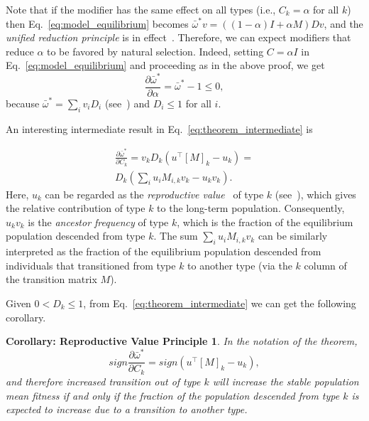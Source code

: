 \documentclass[9pt, a4paper, twocolumn]{extarticle}
\newcommand*{\tr}{^\intercal}
\newtheorem*{rvp}{Corollary: Reproductive Value Principle}
\begin{document}
Note that if the modifier has the same effect on all types (i.e.,
$C_k = \alpha$ for all $k$) then Eq.~\ref{eq:model_equilibrium}
becomes $\bar{\omega}^* v = ((1-\alpha)I + \alpha M)Dv$,
and the \emph{unified reduction principle} is in effect~\cite[eqs. 65, 72]{Altenberg2017}.
Therefore, we can expect modifiers that reduce $\alpha$ to be favored by natural selection.
Indeed, setting $C = \alpha I$ in Eq.~\ref{eq:model_equilibrium} and proceeding as in the above proof, we get
$$
\frac{\partial \bar{\omega}^*}{\partial \alpha} = 
\bar{\omega}^* - 1 \le 0,
$$
because $\bar{\omega}^* = \sum_i{v_i D_i}$ (see~) and $D_i \le 1$ for all $i$.


An interesting intermediate result in Eq.~\ref{eq:theorem_intermediate} is

\begin{equation}
\begin{aligned}
\frac{\partial \bar{\omega}^*}{\partial C_k} = 
v_k D_k (u\tr[M]_k - u_k) = \\
D_k (\sum_i{u_i M_{i,k} v_k} - u_k v_k).
\end{aligned}
\end{equation}
Here, $u_k$ can be regarded as the \emph{reproductive value}~\citep[pg.~27]{Fisher1930} of type $k$ (see~), which gives the relative contribution of type $k$ to the long-term population.
Consequently, $u_k v_k$ is the \emph{ancestor frequency} \citep{Hermisson2002} of type $k$, which is the fraction of the equilibrium population descended from type $k$.
The sum $\sum_i{u_i M_{i,k} v_k}$ can be similarly interpreted as the fraction of the equilibrium population descended from individuals that transitioned from type $k$ to another type (via the $k$ column of the transition matrix $M$).

Given $0 < D_k \le 1$, from Eq.~\ref{eq:theorem_intermediate} we can get the following corollary.

\begin{rvp}
In the notation of the theorem,
\begin{equation}
sign \frac{\partial \bar{\omega}^*}{\partial C_k} = 
sign (u\tr [M]_k - u_k),
\end{equation}
and therefore increased transition out of type $k$ will increase the stable population mean fitness if and only if the fraction of the population descended from type $k$ is expected to increase due to a transition to another type. 
\end{rvp}
\end{document}
